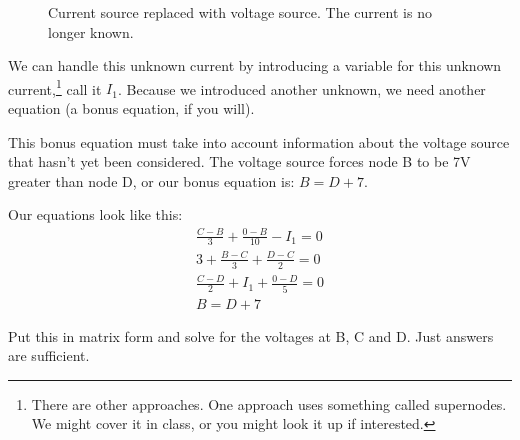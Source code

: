 \begin{figure}[H]
\begin{center}
\caption{Current source replaced with voltage source. The current is no longer known.}
\label{F:4NODV}
\end{center}
\end{figure}

We can handle this unknown current by introducing a variable for this unknown current,\footnote{There are other approaches. One approach uses something called supernodes. We might cover it in class, or you might look it up if interested.} call it $I_1$.  Because we introduced another unknown, we need another equation (a bonus equation, if you will). \par
This bonus equation must take into account information about the voltage source that hasn't yet been considered. The voltage source forces node B to be 7V greater than node D, or our bonus equation is: $B =D+7$.\par
Our equations look like this:
\
\begin{align}
\frac{C-B}{3}+\frac{0-B}{10}-I_1=0 \tag{Node B}\\
3 + \frac{B-C}{3}+\frac{D-C}{2}=0 \tag{Node C}\\
\frac{C-D}{2}+I_1+\frac{0-D}{5}=0 \tag{Node D}\\
B=D+7 \tag{Bonus Equation due to 7V Voltage Source}
\end{align} 

\begin{clevel}
Put this in matrix form and solve for the voltages at B, C and D. Just answers are sufficient.
\end{clevel}

